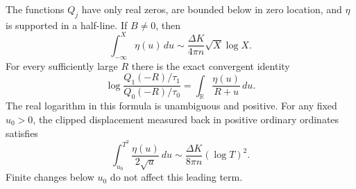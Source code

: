 \begin{theorem}\label{thm:electrical-infinite}
The functions $Q_j$ have only real zeros, are bounded below in zero
location, and $\eta$ is supported in a half-line.  If $B\ne0$, then
\begin{equation}\label{eq:squared-main}
 \boxed{\displaystyle
   \int_{-\infty}^{X}\eta(u)\,du
       \sim \frac{\Delta K}{4\pi n}\sqrt X\log X.}
\end{equation}
For every sufficiently large $R$ there is the exact convergent identity
\begin{equation}\label{eq:squared-stieltjes}
 \boxed{\displaystyle
 \log\frac{Q_1(-R)/\tau_1}{Q_0(-R)/\tau_0}
       =\int_{\mathbb R}\frac{\eta(u)}{R+u}\,du.}
\end{equation}
The real logarithm in this formula is unambiguous and positive.
For any fixed $u_0>0$, the clipped displacement measured back in positive
ordinary ordinates satisfies
\begin{equation}\label{eq:squared-back}
 \boxed{\displaystyle
  \int_{u_0}^{T^2}\frac{\eta(u)}{2\sqrt u}\,du
        \sim\frac{\Delta K}{8\pi n}(\log T)^2.}
\end{equation}
Finite changes below $u_0$ do not affect this leading term.
\end{theorem}

